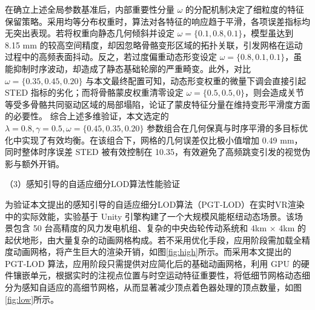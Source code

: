在确立上述全局参数基准后，内部重要性分量 $\omega$ 的分配机制决定了细粒度的特征保留策略。采用均等分布权重时，算法对各特征的响应趋于平滑，各项误差指标均无突出表现。若将权重向静态几何倾斜并设定 $\omega=\{0.1, 0.8, 0.1\}$，模型虽达到 8.15 mm 的较高空间精度，却因忽略骨骼变形区域的拓扑关联，引发网格在运动过程中的高频表面抖动。反之，若过度偏重动态形变设定 $\omega=\{0.8, 0.1, 0.1\}$，虽能抑制时序波动，却造成了静态基础轮廓的严重畸变。此外，对比 $\omega=\{0.35, 0.45, 0.20\}$ 与本文最终配置可知，动态形变权重的微量下调会直接引起 STED 指标的劣化；而将骨骼蒙皮权重清零设定 $\omega=\{0.5, 0.5, 0\}$，则会造成关节等受多骨骼共同驱动区域的局部塌陷，论证了蒙皮特征分量在维持变形平滑度方面的必要性。
综合上述多维验证，本文选定的 $\lambda=0.8, \gamma=0.5, \omega=\{0.45, 0.35, 0.20\}$ 参数组合在几何保真与时序平滑的多目标优化中实现了有效均衡。在该组合下，网格的几何误差仅比极小值增加 0.49 mm，同时整体时序误差 STED 被有效控制在 10.35，有效避免了高频跳变引发的视觉伪影与额外开销。

（3）感知引导的自适应细分LOD算法性能验证

为验证本文提出的感知引导的自适应细分LOD算法（PGT-LOD）在实时VR渲染中的实际效能，实验基于 Unity 引擎构建了一个大规模风能枢纽动态场景。该场景包含 50 台高精度的风力发电机组、复杂的中央齿轮传动系统和 4km $\times$ 4km 的起伏地形，由大量复杂的动画网格构成。若不采用优化手段，应用阶段需加载全精度动画网格，将产生巨大的渲染开销，如图\ref{fig:high}所示。而采用本文提出的 PGT-LOD 算法，应用阶段只需提供对应简化后的基础动画网格，利用 GPU 的硬件镶嵌单元，根据实时的注视点位置与时空运动特征重要性，将低细节网格动态细分为感知自适应的高细节网格，从而显著减少顶点着色器处理的顶点数量，如图\ref{fig:low}所示。




    
    


    
    
